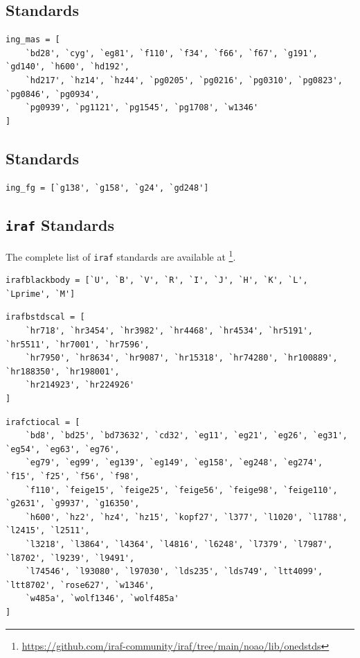 \documentclass[twocolumn, linenumbers]{aastex631}
\begin{document}
\subsection*{\citet{1988ApJ...328..315M} Standards}
\begin{verbatim}
ing_mas = [
    `bd28', `cyg', `eg81', `f110', `f34', `f66', `f67', `g191', `gd140', `h600', `hd192',
    `hd217', `hz14', `hz44', `pg0205', `pg0216', `pg0310', `pg0823', `pg0846', `pg0934',
    `pg0939', `pg1121', `pg1545', `pg1708', `w1346'
]
\end{verbatim}

\subsection*{\citet{1984PASP...96..530F} Standards}
\begin{verbatim}
ing_fg = [`g138', `g158', `g24', `gd248']
\end{verbatim}

\subsection{\texttt{iraf} Standards}
The complete list of \texttt{iraf} standards are available at
\footnote{\url{https://github.com/iraf-community/iraf/tree/main/noao/lib/onedstds}}.

\begin{verbatim}
irafblackbody = [`U', `B', `V', `R', `I', `J', `H', `K', `L', `Lprime', `M']
\end{verbatim}

\begin{verbatim}
irafbstdscal = [
    `hr718', `hr3454', `hr3982', `hr4468', `hr4534', `hr5191', `hr5511', `hr7001', `hr7596',
    `hr7950', `hr8634', `hr9087', `hr15318', `hr74280', `hr100889', `hr188350', `hr198001',
    `hr214923', `hr224926'
]
\end{verbatim}

\begin{verbatim}
irafctiocal = [
    `bd8', `bd25', `bd73632', `cd32', `eg11', `eg21', `eg26', `eg31', `eg54', `eg63', `eg76',
    `eg79', `eg99', `eg139', `eg149', `eg158', `eg248', `eg274', `f15', `f25', `f56', `f98',
    `f110', `feige15', `feige25', `feige56', `feige98', `feige110', `g2631', `g9937', `g16350',
    `h600', `hz2', `hz4', `hz15', `kopf27', `l377', `l1020', `l1788', `l2415', `l2511',
    `l3218', `l3864', `l4364', `l4816', `l6248', `l7379', `l7987', `l8702', `l9239', `l9491',
    `l74546', `l93080', `l97030', `lds235', `lds749', `ltt4099', `ltt8702', `rose627', `w1346',
    `w485a', `wolf1346', `wolf485a'
]
\end{verbatim}
\end{document}
